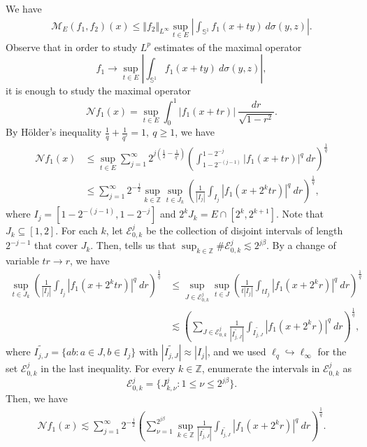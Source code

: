 \documentclass[a4paper,reqno]{amsart}
\newcounter{old}
\numberwithin{equation}{section}
\newcommand{\Z}{{\mathbb Z}}
\begin{document}
	We have 
	\begin{align*}
		\mathcal{M}_{E}(f_1,f_2)(x)\leq \Vert f_2\Vert_{L^\infty} \sup_{t\in E}\left|\int_{\mathbb{S}^{1}}f_1(x+ty)~d\sigma(y,z)\right|.
	\end{align*}
	Observe that in order to study $L^p$ estimates of the maximal operator 
	$$f_1\rightarrow \sup_{t\in E}\left|\int_{\mathbb{S}^{1}}f_1(x+ty)~d\sigma(y,z)\right|,$$ 
	it is enough to study the maximal operator
	\[\mathcal{N}f_1(x)=\sup_{t\in E}\int^{1}_{0}|f_1(x+tr)|~\frac{dr}{\sqrt{1-r^2}}.\]
	By H\"older's inequality $\frac{1}{q}+\frac{1}{q'}=1,~q\geq1$, we have
	\begin{align*}
		\mathcal{N}f_1(x)
		&\leq \sup_{t\in E}\sum_{j=1}^\infty 2^{j\left(\frac{1}{2}-\frac{1}{q'}\right)}\left(\int_{1-2^{-(j-1)}}^{1-2^{-j}}|f_1(x+tr)|^q~dr\right)^{\frac{1}{q}}\\
		&\leq\sum_{j=1}^\infty 2^{-\frac{j}{2}}\sup_{k\in \mathbb{Z}}\sup_{t\in J_k}\left(\frac{1}{|I_j|}\int_{I_j}|f_1(x+2^ktr)|^q~dr\right)^\frac{1}{q},
	\end{align*}
	where $I_j=[1-2^{-(j-1)},1-2^{-j}]$ and $2^kJ_k=E\cap[2^k,2^{k+1}]$. Note that $J_k\subseteq [1,2]$. For each $k$, let $\mathcal{E}_{0,k}^{j}$ be the collection of disjoint intervals
	of length $2^{-j-1}$ that cover $J_k$. Then,  tells us that $\sup_{k\in\Z}\#\mathcal{E}_{0,k}^{j}\lesssim 2^{j\beta}$. By a change of variable $tr\to r$, we have
	\begin{align*}
		\sup_{t\in J_k}\left(\frac{1}{|I_j|}\int_{I_j}|f_1(x+2^ktr)|^q~dr\right)^\frac{1}{q}&\leq\sup_{J\in \mathcal{E}_{0,k}^{j}}\sup_{t\in J}\left(\frac{1}{t|I_j|}\int_{tI_j}|f_1(x+2^kr)|^q~dr\right)^\frac{1}{q}\\
		&\lesssim\left(\sum_{J\in \mathcal{E}_{0,k}^{j}}\frac{1}{|\widetilde{I_{j,J}}|}\int_{\widetilde{I_{j,J}}}|f_1(x+2^kr)|^q~dr\right)^\frac{1}{q},
	\end{align*}
	where $\widetilde{I_{j,J}}=\{ab:a\in J, b\in I_j\}$ with $|\widetilde{I_{j,J}}|\approx |I_j|$, and we used $\ell_q\hookrightarrow\ell_{\infty}$ for the set $\mathcal{E}_{0,k}^{j}$ in the last inequality. For every \(k\in\mathbb Z\), enumerate the intervals in $\mathcal E_{0,k}^j$ as
	\[\mathcal E_{0,k}^j=\{J_{k,\nu}^j:1\leq\nu\leq 2^{j\beta}\}.\]
	Then, we have
	\begin{align*}
		\mathcal{N}f_1(x)\lesssim\sum_{j=1}^\infty 2^{-\frac{j}{2}}\left(\sum_{\nu=1}^{2^{j\beta}}\sup_{k\in \mathbb{Z}}\frac{1}{|\widetilde{I_{j,J}}|}\int_{\widetilde{I_{j,J}}}|f_1(x+2^kr)|^q~dr\right)^\frac{1}{q}.
	\end{align*}
\end{document}
